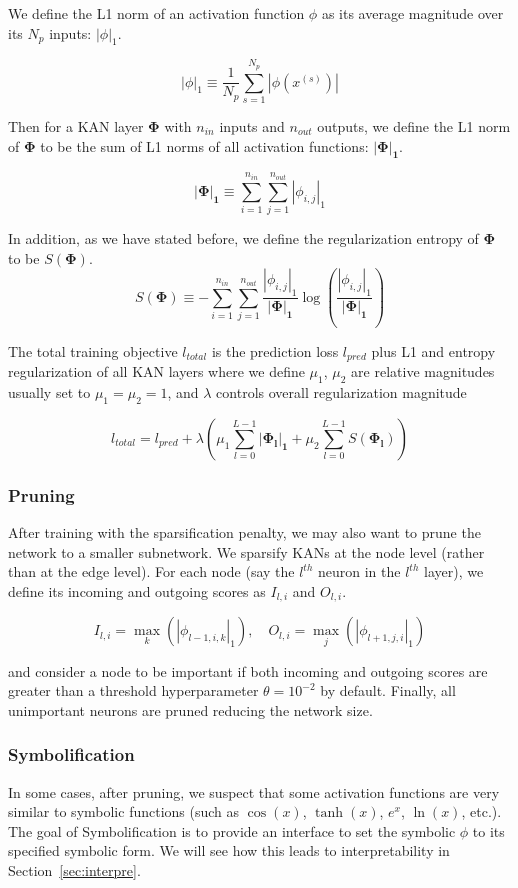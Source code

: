 We define the L1 norm of an activation function $\phi$ as its average magnitude over its $N_p$ inputs: $|\phi|_1$.

$$|\phi|_1 \equiv \frac{1}{N_p} \sum_{s=1}^{N_p} |\phi(x^{(s)})|$$

Then for a KAN layer $\boldsymbol{\Phi}$ with $n_{in}$ inputs and $n_{out}$ outputs, we define the L1 norm of $\boldsymbol{\Phi}$ to be the sum of L1 norms of all activation functions: $\boldsymbol{|\Phi|_1}$.

$$\boldsymbol{|\Phi|_1} \equiv \sum_{i=1}^{n_{in}}\sum_{j=1}^{n_{out}}|\phi_{i,j}|_1$$

In addition, as we have stated before, we define the regularization entropy of $\boldsymbol{\Phi}$ to be $S(\boldsymbol{\Phi})$.
$$S(\boldsymbol{\Phi}) \equiv -\sum_{i=1}^{n_{in}}\sum_{j=1}^{n_{out}} \frac{|\phi_{i,j}|_1}{\boldsymbol{|\Phi|_1}}\log(\frac{|\phi_{i,j}|_1}{\boldsymbol{|\Phi|_1}})$$

The total training objective $l_{total}$ is the prediction loss $l_{pred}$ plus L1 and entropy regularization of
all KAN layers where we define $\mu_1$, $\mu_2$ are relative magnitudes usually set to $\mu_1 = \mu_2 = 1$, and $\lambda$ controls overall regularization magnitude

$$l_{total} = l_{pred} + \lambda(\mu_1\sum_{l=0}^{L-1}\boldsymbol{|\Phi_l|_1} + \mu_2\sum_{l=0}^{L-1} S(\boldsymbol{\Phi_l}))$$

\subsubsection{Pruning}
After training with the sparsification penalty, we may also want to prune the network to a smaller subnetwork. We sparsify KANs at the node level (rather than at the edge level). For each node (say the $l^{th}$ neuron in the $l^{th}$ layer), we define its incoming and outgoing scores as $ I_{l, i}$ and $ O_{l, i}$.

$$ I_{l,i} = \max_k(|\phi_{l-1,i,k}|_1), \quad O_{l,i} = \max_j(|\phi_{l+1,j,i}|_1) $$

and consider a node to be important if both incoming and outgoing scores are greater than a threshold hyperparameter $\theta = 10^{-2}$ by default. Finally, all unimportant neurons are pruned reducing the network size.

\subsubsection{Symbolification}
In some cases, after pruning, we suspect that some activation functions are very similar to symbolic functions (such as $\cos(x)$, $\tanh(x)$, $e^x$, $\ln(x)$, etc.). The goal of Symbolification is to provide an interface to set the symbolic $\phi$ to its specified symbolic form. We will see how this leads to interpretability in Section~\ref{sec:interpre}.

